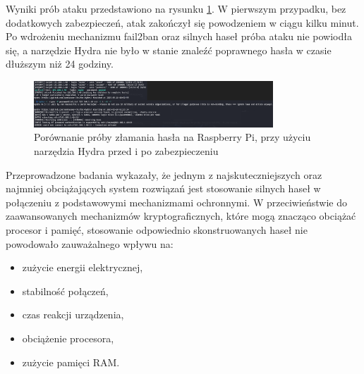 Wyniki prób ataku przedstawiono na rysunku \ref{fig:Porównanie próby złamania hasła na Raspberry Pi, przy użyciu narzędzia Hydra przed i po zabezpieczeniu}. W pierwszym przypadku, bez dodatkowych zabezpieczeń, atak zakończył się powodzeniem w ciągu kilku minut. Po wdrożeniu mechanizmu fail2ban oraz silnych haseł próba ataku nie powiodła się, a narzędzie Hydra nie było w stanie znaleźć poprawnego hasła w czasie dłuższym niż 24 godziny.
\begin{figure}[h]
    \centering
    \includegraphics[width=0.8\textwidth]{pictures/hydra-atack-pi.png}
    \caption{Porównanie próby złamania hasła na Raspberry Pi, przy użyciu narzędzia Hydra przed i po zabezpieczeniu}
    \label{fig:Porównanie próby złamania hasła na Raspberry Pi, przy użyciu narzędzia Hydra przed i po zabezpieczeniu}
\end{figure}

Przeprowadzone badania wykazały, że jednym z najskuteczniejszych oraz najmniej obciążających system rozwiązań jest stosowanie silnych haseł w połączeniu z podstawowymi mechanizmami ochronnymi. W przeciwieństwie do zaawansowanych mechanizmów kryptograficznych, które mogą znacząco obciążać procesor i pamięć, stosowanie odpowiednio skonstruowanych haseł nie powodowało zauważalnego wpływu na:
\begin{itemize}
    \item zużycie energii elektrycznej,
    \item stabilność połączeń,
    \item czas reakcji urządzenia,
    \item obciążenie procesora,
    \item zużycie pamięci RAM.
\end{itemize}

